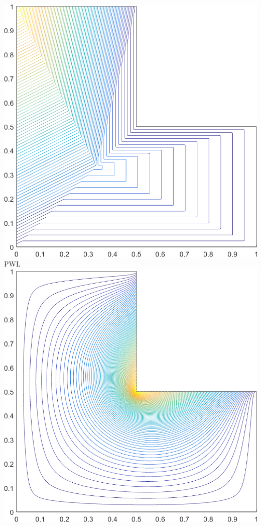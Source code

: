\documentclass[compress,10pt]{beamer}
\begin{document}
\begin{frame}[t]
{\begin{columns}
{}\includegraphics[width=0.85\columnwidth]{images/L-domain_PWLD1_contour_b6.png}\\
PWL\\ 
\centering
{}\includegraphics[width=0.85\columnwidth]{images/L-domain_MV1_contour_b4.png} \\
\vspace{3mm}

\end{columns}}
\end{frame}
\end{document}
